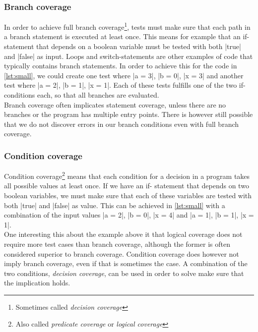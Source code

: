 \subsubsection{Branch coverage}

In order to achieve full branch coverage\footnote{Sometimes called
\emph{decision coverage}}, tests must make sure that each path in a
branch statement is executed at least once. This means for example that
an if-statement that depends on a boolean variable must be tested with
both |true| and |false| as input. Loops and switch-statements are other
examples of code that typically contains branch statements. In order to
achieve this for the code in \ref{lst:small}, we could create one test
where |a = 3|, |b = 0|, |x = 3| and another test where |a = 2|, |b = 1|,
|x = 1|. Each of these tests fulfills one of the two if-conditions
each, so that all branches are evaluated.\\

Branch coverage often implicates statement coverage, unless there are no
branches or the program has multiple entry points. There is however
still possible that we do not discover errors in our branch conditions
even with full branch coverage.\\


\subsubsection{Condition coverage}

Condition coverage\footnote{Also called \emph{predicate coverage} or
\emph{logical coverage}} means that each condition for a decision in a
program takes all possible values at least once. If we have an if-
statement that depends on two boolean variables, we must make sure that
each of these variables are tested with both |true| and |false| as
value. This can be achieved in \ref{lst:small} with a combination of
the input values |a = 2|, |b = 0|, |x = 4| and |a = 1|, |b = 1|,
|x = 1|.\\

One interesting this about the example above it that logical coverage
does not require more test cases than branch coverage, although the
former is often considered superior to branch coverage. Condition
coverage does however not imply branch coverage, even if that is
sometimes the case. A combination of the two conditions,
\emph{decision coverage}, can be used in order to solve make
sure that the implication holds.\\


